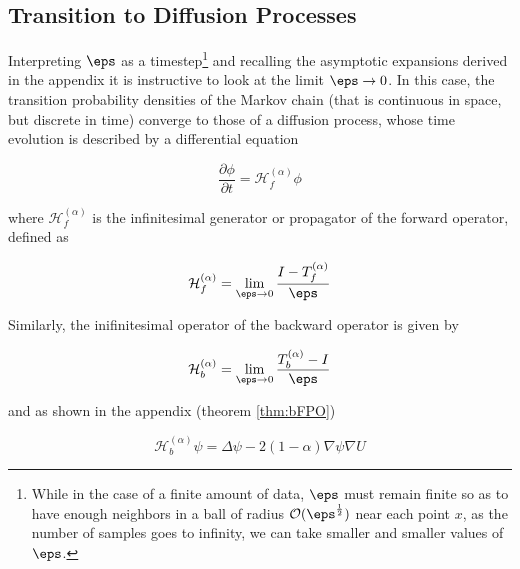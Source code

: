 \subsection{Transition to Diffusion Processes}
Interpreting $\eps$ as a timestep\footnote{While in the case of a finite amount of data, $\eps$ must remain finite so as to have enough neighbors in a ball of radius $\mathcal{O}(\eps^\frac{1}{2})$ near each point $x$, as the number of samples goes to infinity, we can take smaller and smaller values of $\eps$.} and recalling the asymptotic expansions derived in the appendix it is instructive to look at the limit $\eps \rightarrow 0$. In this case, the transition probability densities of the Markov chain (that is continuous in space, but discrete in time) converge to those of a diffusion process, whose time evolution is described by a differential equation

\begin{equation*}
\frac{\partial \phi}{\partial t} = \mathcal{H}_f^{(\alpha)}\phi
\end{equation*}

where $\mathcal{H}_f^{(\alpha)}$ is the infinitesimal generator or propagator of the forward operator, defined as

\begin{definition}\begin{equation*}
\mathcal{H}_f^{(\alpha)}=\lim_{\eps\rightarrow 0}\frac{I-T_f^{(\alpha)}}{\eps}
\end{equation*}\end{definition}

Similarly, the inifinitesimal operator of the backward operator is given by

\begin{definition}\begin{equation*}
\mathcal{H}_b^{(\alpha)}=\lim_{\eps\rightarrow 0}\frac{T_b^{(\alpha)}-I}{\eps}
\end{equation*}\end{definition}

and as shown in the appendix (theorem \ref{thm:bFPO})

\begin{equation*}
\mathcal{H}_b^{(\alpha)}\psi = \Delta\psi - 2(1-\alpha)\nabla\psi\nabla U
\end{equation*}
